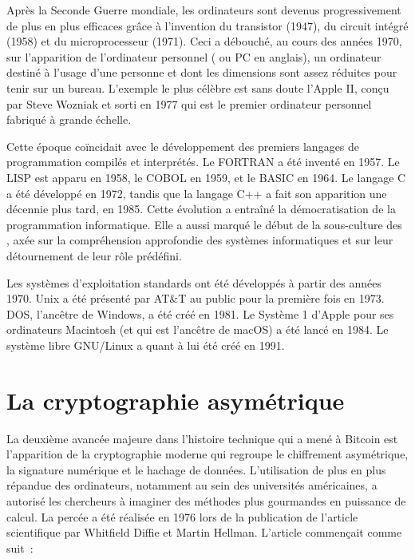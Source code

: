Après la Seconde Guerre mondiale, les ordinateurs sont devenus progressivement de plus en plus efficaces grâce à l'invention du transistor (1947), du circuit intégré (1958) et du microprocesseur (1971). Ceci a débouché, au cours des années 1970, sur l'apparition de l'ordinateur personnel ( ou PC en anglais), un ordinateur destiné à l'usage d'une personne et dont les dimensions sont assez réduites pour tenir sur un bureau. L'exemple le plus célèbre est sans doute l'Apple II, conçu par Steve Wozniak et sorti en 1977 qui est le premier ordinateur personnel fabriqué à grande échelle.

Cette époque coïncidait avec le développement des premiers langages de programmation compilés et interprétés. Le FORTRAN a été inventé en 1957. Le LISP est apparu en 1958, le COBOL en 1959, et le BASIC en 1964. Le langage C a été développé en 1972, tandis que la langage C++ a fait son apparition une décennie plus tard, en 1985. Cette évolution a entraîné la démocratisation de la programmation informatique. Elle a aussi marqué le début de la sous-culture des , axée sur la compréhension approfondie des systèmes informatiques et sur leur détournement de leur rôle prédéfini. %

Les systèmes d'exploitation standards ont été développés à partir des années 1970. Unix a été présenté par AT\&T au public pour la première fois en 1973. DOS, l'ancêtre de Windows, a été créé en 1981. Le Système 1 d'Apple pour ses ordinateurs Macintosh (et qui est l'ancêtre de macOS) a été lancé en 1984. Le système libre GNU/Linux a quant à lui été créé en 1991.

\section*{La cryptographie asymétrique} %

La deuxième avancée majeure dans l'histoire technique qui a mené à Bitcoin est l'apparition de la cryptographie moderne qui regroupe le chiffrement asymétrique, la signature numérique et le hachage de données. L'utilisation de plus en plus répandue des ordinateurs, notamment au sein des universités américaines, a autorisé les chercheurs à imaginer des méthodes plus gourmandes en puissance de calcul. La percée a été réalisée en 1976 lors de la publication de l'article scientifique  par Whitfield Diffie et Martin Hellman. L'article commençait comme suit~:

